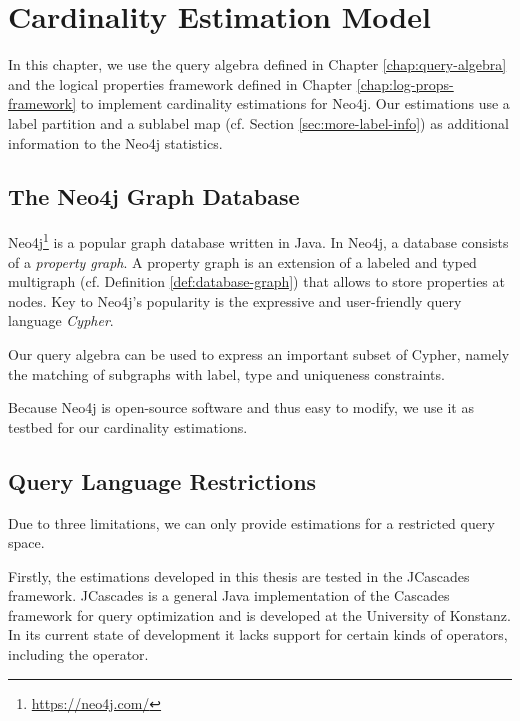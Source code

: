 \chapter{Cardinality Estimation Model}

\label{chap:neo4j-impl}

\begin{aboutchapter}
In this chapter, we use the query algebra defined
in Chapter \ref{chap:query-algebra} and the logical properties framework
defined in Chapter \ref{chap:log-props-framework}
to implement cardinality estimations for Neo4j.
Our estimations use a label partition and a sublabel map (cf. Section
\ref{sec:more-label-info}) as additional
information to the Neo4j statistics.
\end{aboutchapter}

\section{The Neo4j Graph Database}
\label{sec:about-neo4j}

Neo4j\footnote{\url{https://neo4j.com/}}
is a popular graph database written in Java. In Neo4j, a database consists of a
\emph{property graph}. A property graph is an extension of a labeled and typed
multigraph (cf. Definition \ref{def:database-graph}) that allows to store
properties at nodes.
Key to Neo4j's popularity is the expressive and user-friendly query language
\emph{Cypher}.

Our query algebra can be used to express an important subset of Cypher, namely
the matching of subgraphs with label, type and uniqueness constraints.

Because Neo4j is open-source software and thus easy to modify, we use
it as testbed for our cardinality estimations.

\section{Query Language Restrictions}
\label{sec:query-restrictions}

Due to three limitations, we can only provide estimations for a restricted
query space.

Firstly, the estimations developed in this thesis are tested in the JCascades
framework.
JCascades is a general Java implementation of the Cascades
framework for query optimization and is developed at the University of
Konstanz. In its current state of development it lacks support for certain
kinds of operators, including the  operator.

